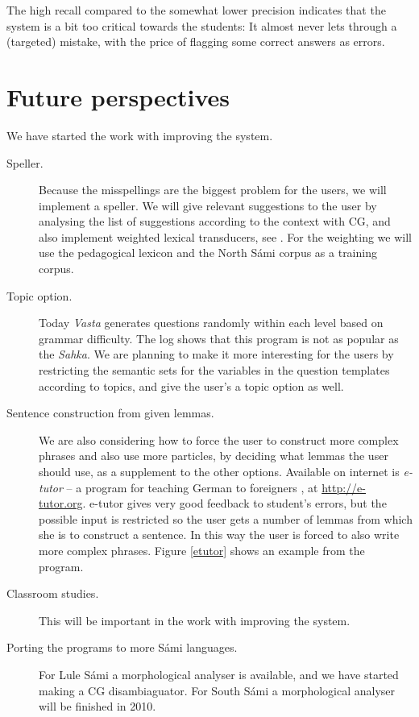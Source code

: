 \documentclass[11pt]{article}
\begin{document}
The high recall compared to the somewhat lower precision indicates that the system is a bit too critical towards the students: It almost never lets through a (targeted) mistake, with the price of flagging some correct answers as errors.
 
\section{Future perspectives}
We have started the work with improving the system.
\begin{description}
\item [Speller.] Because the misspellings are the biggest problem for the users, we will implement a speller. We will give relevant suggestions to the user by analysing the list of suggestions according to the context with CG, and also implement weighted lexical transducers, see \cite{Linden:09}. For the weighting we will use the pedagogical lexicon and the North Sámi corpus as a training corpus.
\item [Topic option.] Today \textit{Vasta} generates questions randomly within each level based on grammar difficulty. The log shows that this program is not as popular as the \textit{Sahka}. We are planning to make it more interesting for the users by restricting the semantic sets for the variables in the question templates according to topics, and give the user's a topic option as well.
\item [Sentence construction from given lemmas.] We are also considering how to force the user to construct more complex phrases and also use more particles, by deciding what lemmas the user should use, as a supplement to the other options. Available on internet is \textit{e-tutor} -- a program for teaching German to foreigners \cite{Heift:01}, at \url{http://e-tutor.org}. e-tutor gives very good feedback to student's errors, but the possible input is restricted so the user gets a number of lemmas from which she is to construct a sentence. In this way the user is forced to also write more complex phrases. Figure \ref{etutor} shows an example from the program.
\item [Classroom studies.] This will be important in the work with improving the system.
\item [Porting the programs to more Sámi languages.] For Lule Sámi a morphological analyser is available, and we have started making a CG disambiaguator. For South Sámi a morphological analyser will be finished in 2010. 
  \end{description} 
  \vspace{0.7cm}
\end{document}
